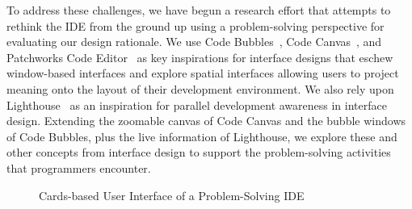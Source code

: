 To address these challenges, we have begun a research effort that attempts to rethink the IDE from the ground up using a problem-solving perspective for evaluating our design rationale.
We use Code Bubbles~\cite{bragdon2010bubbles}, Code Canvas~\cite{deline2010canvas}, and Patchworks Code Editor~\cite{henley2014patchworks} as key inspirations for interface designs that eschew window-based interfaces and explore spatial interfaces allowing users to project meaning onto the layout of their development environment.
We also rely upon Lighthouse~\cite{dasilva2006lighthouse} as an inspiration for parallel development awareness in interface design.
Extending the zoomable canvas of Code Canvas and the bubble windows of Code Bubbles, plus the live information of Lighthouse, we explore these and other concepts from interface design to support the problem-solving activities that programmers encounter.

\vspace*{-0.3\baselineskip}
\begin{figure}[h!]
	\caption{Cards-based User Interface of a Problem-Solving IDE}
	\label{mockup}
    \centering
	\vspace*{-0.4\baselineskip}
\end{figure}

